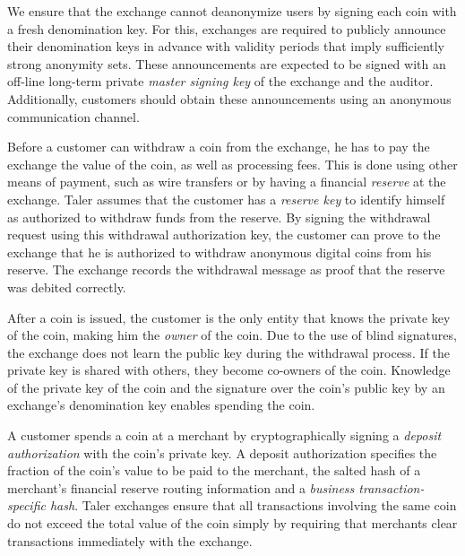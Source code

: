\documentclass[sigconf, authordraft]{acmart}
\begin{document}
We ensure that the exchange cannot deanonymize users by signing
each coin with a fresh denomination key.  For this, exchanges are
required to publicly announce their denomination keys in advance
with validity periods that imply sufficiently strong anonymity sets.
These announcements are expected to be signed with an off-line
long-term private {\em master signing key} of the exchange and the
auditor.  Additionally, customers should obtain these announcements
using an anonymous communication channel.

Before a customer can withdraw a coin from the exchange, he has to pay
the exchange the value of the coin, as well as processing fees.  This
is done using other means of payment, such as wire transfers or by
having a financial {\em reserve} at the exchange.  Taler assumes that
the customer has a {\em reserve key} to identify
himself as authorized to withdraw funds from the reserve.  By signing
the withdrawal request using this withdrawal authorization key, the
customer can prove to the exchange that he is authorized to withdraw
anonymous digital coins from his reserve.  The exchange records the
withdrawal message as proof that the reserve was debited correctly.


After a coin is issued, the customer is the only entity that knows the
private key of the coin, making him the \emph{owner} of the coin.  Due
to the use of blind signatures, the exchange does not learn the
public key during the withdrawal process.  If the private key is
shared with others, they become co-owners of the coin.  Knowledge of
the private key of the coin and the signature over the coin's public
key by an exchange's denomination key enables spending the
coin.



A customer spends a coin at a merchant by cryptographically signing a
{\em deposit authorization} with the coin's private key.  A deposit
authorization specifies the fraction of the coin's value to be paid to
the merchant, the salted hash of a merchant's financial reserve
routing information and a {\em business transaction-specific hash}.
Taler exchanges ensure that all transactions involving the same coin
do not exceed the total value of the coin simply by requiring that
merchants clear transactions immediately with the exchange.
\end{document}
